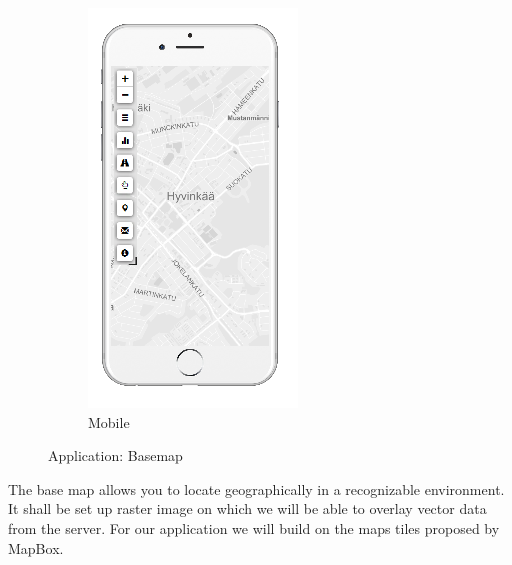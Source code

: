 \begin{figure}[ht]
\begin{subfigure}[b]{0.2\textwidth}
        \includegraphics[width=\textwidth]
          {img/c02-application/png/mobile-basemap.png}
        \caption{Mobile}
    \end{subfigure}
    \caption{Application: Basemap}
\end{figure}

The base map allows you to locate geographically in a recognizable environment. It shall be set up raster image on which we will be able to overlay vector data from the server. For our application we will build on the maps tiles proposed by MapBox.



